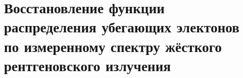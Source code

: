 \chapter{Восстановление функции распределения убегающих электонов по измеренному спектру жёсткого рентгеновского излучения}\label{ch:ch3}

\FloatBarrier
